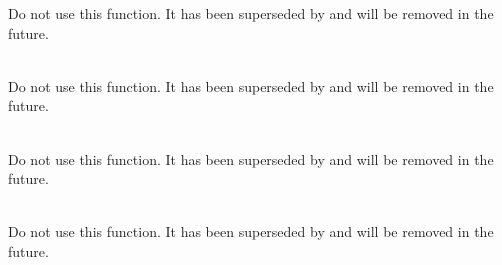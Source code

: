 \begin{DoxyRefList}
\label{deprecated__deprecated000008}%
%
Do not use this function. It has been superseded by  and will be removed in the future.  
\item[{\parbox[t]{\linewidth}{Global \doxylink{group___complex_f_f_t_deprecated_ga28dc8748f5aff112f792ae51c74925c8}{arm\+\_\+cfft\+\_\+radix2\+\_\+q15} (const \doxylink{structarm__cfft__radix2__instance__q15}{arm\+\_\+cfft\+\_\+radix2\+\_\+instance\+\_\+q15} \texorpdfstring{$\ast$}{*}S, \doxylink{group__generic_types_gab5a8fb21a5b3b983d5f54f31614052ea}{q15\+\_\+t} \texorpdfstring{$\ast$}{*}p\+Src)}}]\hfill \\
\label{deprecated__deprecated000009}%
%
Do not use this function. It has been superseded by  and will be removed in the future.  
\item[{\parbox[t]{\linewidth}{Global \doxylink{group___complex_f_f_t_deprecated_ga19cd1e1adc3992fece00ec9f028adafb}{arm\+\_\+cfft\+\_\+radix2\+\_\+q31} (const \doxylink{structarm__cfft__radix2__instance__q31}{arm\+\_\+cfft\+\_\+radix2\+\_\+instance\+\_\+q31} \texorpdfstring{$\ast$}{*}S, \doxylink{group__generic_types_gadc89a3547f5324b7b3b95adec3806bc0}{q31\+\_\+t} \texorpdfstring{$\ast$}{*}p\+Src)}}]\hfill \\
\label{deprecated__deprecated000010}%
%
Do not use this function. It has been superseded by  and will be removed in the future.  
\item[{\parbox[t]{\linewidth}{Global \doxylink{group___complex_f_f_t_deprecated_gad504b6752cbf57d7002a641bf766c20f}{arm\+\_\+cfft\+\_\+radix4\+\_\+f32} (const \doxylink{structarm__cfft__radix4__instance__f32}{arm\+\_\+cfft\+\_\+radix4\+\_\+instance\+\_\+f32} \texorpdfstring{$\ast$}{*}S, \doxylink{group__generic_types_ga4611b605e45ab401f02cab15c5e38715}{float32\+\_\+t} \texorpdfstring{$\ast$}{*}p\+Src)}}]\hfill \\
\label{deprecated__deprecated000011}%
%
Do not use this function. It has been superseded by  and will be removed in the future.  
\item[{\parbox[t]{\linewidth}{Global \doxylink{group___complex_f_f_t_deprecated_ga4bb15488a420e343c1ded7ee99daa307}{arm\+\_\+cfft\+\_\+radix4\+\_\+init\+\_\+f32} (\doxylink{structarm__cfft__radix4__instance__f32}{arm\+\_\+cfft\+\_\+radix4\+\_\+instance\+\_\+f32} \texorpdfstring{$\ast$}{*}S, uint16\+\_\+t fft\+Len, uint8\+\_\+t ifft\+Flag, uint8\+\_\+t bit\+Reverse\+Flag)}}]\hfill \\

\end{DoxyRefList}
